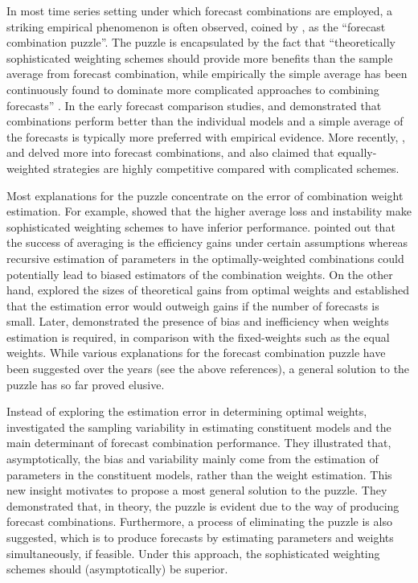 \documentclass{monashthesis}
\begin{document}
In most time series setting under which forecast combinations are employed, a striking empirical phenomenon is often observed, coined by \textcite{SW04}, as the ``forecast combination puzzle''. The puzzle is encapsulated by the fact that ``theoretically sophisticated weighting schemes should provide more benefits than the sample average from forecast combination, while empirically the simple average has been continuously found to dominate more complicated approaches to combining forecasts'' \autocite{WHLK22}. In the early forecast comparison studies, \textcite{MACF82} and \textcite{SW98} demonstrated that combinations perform better than the individual models and a simple average of the forecasts is typically more preferred with empirical evidence. More recently, \textcite{SW04}, \textcite{MSA18} and \textcite{MSA20} delved more into forecast combinations, and also claimed that equally-weighted strategies are highly competitive compared with complicated schemes.

Most explanations for the puzzle concentrate on the error of combination weight estimation. For example, \textcite{SW04} showed that the higher average loss and instability make sophisticated weighting schemes to have inferior performance. \textcite{T06} pointed out that the success of averaging is the efficiency gains under certain assumptions whereas recursive estimation of parameters in the optimally-weighted combinations could potentially lead to biased estimators of the combination weights. On the other hand, \textcite{E11} explored the sizes of theoretical gains from optimal weights and established that the estimation error would outweigh gains if the number of forecasts is small. Later, \textcite{CMVW16} demonstrated the presence of bias and inefficiency when weights estimation is required, in comparison with the fixed-weights such as the equal weights. While various explanations for the forecast combination puzzle have been suggested over the years (see the above references), a general solution to the puzzle has so far proved elusive.

Instead of exploring the estimation error in determining optimal weights, \textcite{ZMFP22} investigated the sampling variability in estimating constituent models and the main determinant of forecast combination performance. They illustrated that, asymptotically, the bias and variability mainly come from the estimation of parameters in the constituent models, rather than the weight estimation. This new insight motivates \textcite{FZMP23} to propose a most general solution to the puzzle. They demonstrated that, in theory, the puzzle is evident due to the way of producing forecast combinations. Furthermore, a process of eliminating the puzzle is also suggested, which is to produce forecasts by estimating parameters and weights simultaneously, if feasible. Under this approach, the sophisticated weighting schemes should (asymptotically) be superior.
\end{document}
